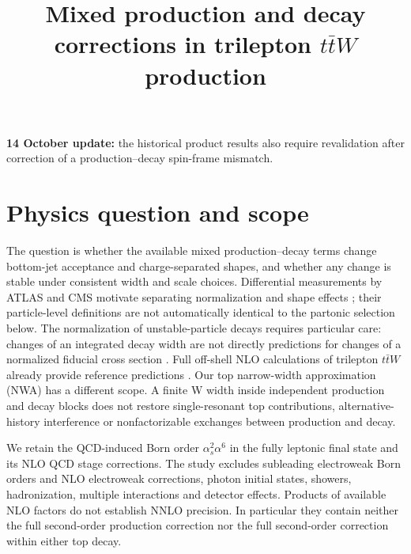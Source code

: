 \documentclass[11pt,a4paper]{article}
\title{\boldmath Mixed production and decay corrections in trilepton $t\bar tW$ production}
\newcommand{\ttW}{t\bar t W}
\newcommand{\as}{\alpha_s}
\begin{document}
\maketitle
\begin{center}
\par\smallskip
\textbf{14 October update:} the historical product results also require
revalidation after correction of a production--decay spin-frame mismatch.
\end{center}

\section{Physics question and scope}

The question is whether the available mixed production--decay terms change
bottom-jet acceptance and charge-separated shapes, and whether any change
is stable under consistent width and scale choices. Differential measurements
by ATLAS and CMS motivate separating normalization and shape effects
\cite{ATLAS2024,CMS2026}; their particle-level definitions are not automatically
identical to the partonic selection below. The normalization of
unstable-particle decays requires particular care: changes of an integrated
decay width are not directly predictions for changes of a normalized
fiducial cross section \cite{Denner2012,Jezo2023}.
Full off-shell NLO calculations of trilepton $\ttW$ already provide
reference predictions \cite{Bevilacqua2020,Denner2020}. Our top
narrow-width approximation (NWA) has a different scope. A finite W width
inside independent production and decay blocks does not restore
single-resonant top contributions, alternative-history interference or
nonfactorizable exchanges between production and decay.

We retain the QCD-induced Born order $\as^2\alpha^6$ in the fully
leptonic final state and its NLO QCD stage corrections. The study excludes
subleading electroweak Born orders and NLO electroweak corrections, photon
initial states, showers, hadronization, multiple interactions and detector
effects. Products of available NLO factors do not establish NNLO precision.
In particular they contain neither the full second-order production
correction nor the full second-order correction within either top decay.
\end{document}
